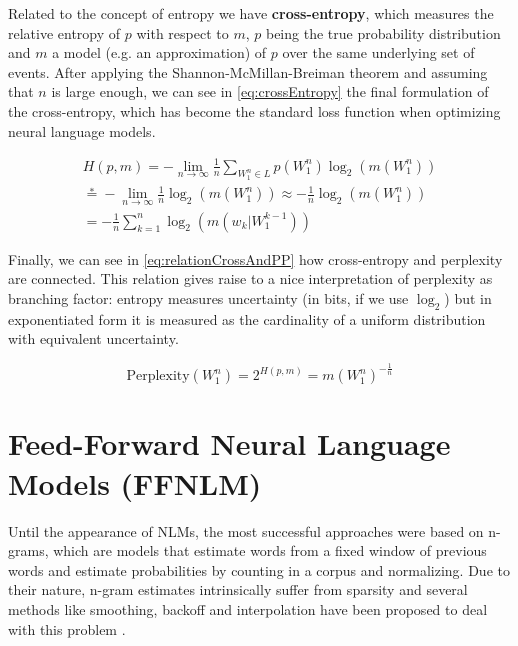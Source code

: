 Related to the concept of entropy we have \textbf{cross-entropy}, which measures the relative entropy of $p$ with respect to $m$, $p$ being the true probability distribution and $m$ a model (e.g. an approximation) of $p$ over the same underlying set of events. After applying the Shannon-McMillan-Breiman theorem and assuming that $n$ is large enough, we can see in \autoref{eq:crossEntropy} the final formulation of the cross-entropy, which has become the standard loss function when optimizing neural language models.

\begin{equation} \label{eq:crossEntropy}
	\begin{gathered}
		H(p,m) = -\lim\limits_{n \rightarrow \infty}\frac{1}{n}\sum_{W_1^n \in L}p(W_1^n)\log_2(m(W_1^n)) \\
		\stackrel{*}{=} -\lim\limits_{n \rightarrow \infty}\frac{1}{n}\log_2(m(W_1^n)) \approx -\frac{1}{n}\log_2(m(W_1^n)) \\
		= -\frac{1}{n}\sum_{k=1}^{n}\log_2(m(w_k|W_{1}^{k-1}))
	\end{gathered}
\end{equation}

Finally, we can see in \autoref{eq:relationCrossAndPP} how cross-entropy and perplexity are connected. This relation gives raise to a nice interpretation of perplexity as branching factor: entropy measures uncertainty (in bits, if we use $\log_2$) but in exponentiated form it is measured as the cardinality of a uniform distribution with equivalent uncertainty.

\begin{equation} \label{eq:relationCrossAndPP}
	\text{Perplexity}(W_1^n) = 2^{H(p,m)} = m(W_1^n)^{-\frac{1}{n}}
\end{equation}

\section{Feed-Forward Neural Language Models (FFNLM)}
\label{sec:forwardnlm}

Until the appearance of NLMs, the most successful approaches were based on n-grams, which are models that estimate words from a fixed window of previous words and estimate probabilities by counting in a corpus and normalizing. Due to their nature, n-gram estimates intrinsically suffer from sparsity and several methods like smoothing, backoff and interpolation have been proposed to deal with this problem \cite{goodman2001bit}.


